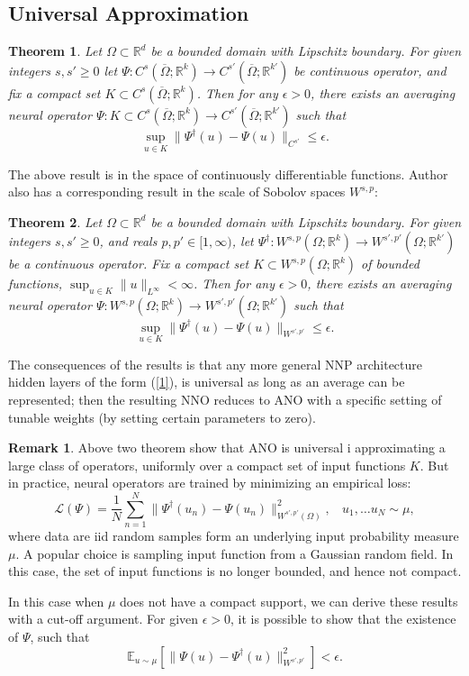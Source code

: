 \documentclass[reqno]{amsart}
\theoremstyle{plain}
\newtheorem{thm}{Theorem}
\theoremstyle{definition}
\newtheorem{rem}{Remark}
\newcommand{\bb}[1]{\mathbb{#1}}
\newcommand{\cal}[1]{\mathcal{#1}}
\begin{document}
\subsection{\bf Universal Approximation}
\begin{thm}\label{thm2.1}
    Let $\Omega \subset \bb R^d$ be a bounded domain with Lipschitz boundary. For given integers $s,s' \geq 0$ let $\Psi : C^s(\overline{\Omega};\bb R^k) \to C^{s'}(\overline{\Omega};\bb R^{k'})$ be continuous operator, and fix a compact set $K \subset C^s(\overline{\Omega};\bb R^k)$. Then for any $\epsilon > 0$, there exists an averaging neural operator $\Psi : K \subset C^s(\overline{\Omega};\bb R^k) \to C^{s'}(\overline{\Omega};\bb R^{k'})$ such that 
    $$ \sup\limits_{u \in K}\|\Psi^\dag (u) - \Psi(u)\|_{C^{s'}} \leq \epsilon.$$ 
\end{thm}
The above result is in the space of continuously differentiable functions. Author also has a corresponding result in the scale of Sobolov spaces $W^{s,p}$:
\begin{thm} \label{thm2.2}
    Let $\Omega \subset \bb R^d$ be a bounded domain with Lipschitz boundary. For given integers $s,s'\geq 0$, and reals $p,p' \in [1,\infty)$, let $\Psi^\dag: W^{s,p}(\Omega;\bb R^k) \to W^{s',p'}(\Omega;\bb R^{k'})$ be a continuous operator. Fix a compact set $K \subset W^{s,p}(\Omega;\bb R^k)$ of bounded functions, $\sup_{u \in K}\|u\|_{L^\infty} < \infty$. Then for any $\epsilon > 0$, there exists an averaging neural operator $\Psi:W^{s,p}(\Omega;\bb R^k) \to W^{s',p'}(\Omega;\bb R^{k'})$ such that 
    $$ \sup\limits_{u\in K}\|\Psi^\dag(u) - \Psi(u)\|_{W^{s',p'}} \leq \epsilon.$$
\end{thm}
The consequences of the results is that any more general NNP architecture hidden layers of the form (\ref{1}), is universal as long as an average can be represented; then the resulting NNO reduces to ANO with a specific setting of tunable weights (by setting certain parameters to zero).
\begin{rem}
    Above two theorem show that ANO is universal i approximating a large class of operators, uniformly over a compact set of input functions $K$. But in practice, neural operators are trained by minimizing an empirical loss:
    $$ \cal L(\Psi) = \frac{1}{N} \sum\limits_{n=1}^{N} \|\Psi^\dag(u_n) - \Psi(u_n)\|^2_{W^{s',p'}(\Omega)},~~~~u_1, \dots u_N \sim \mu,$$
    where data are iid random samples form an underlying input probability measure $\mu$. A popular choice is sampling input function from a Gaussian random field. In this case, the set of input functions is no longer bounded, and hence not compact.

    \noindent In this case when $\mu$ does not have a compact support, we can derive these results with a cut-off argument. For given $\epsilon > 0$, it is possible to show that the existence of $\Psi$, such that 
    $$ \bb E_{u\sim\mu}[\|\Psi(u) - \Psi^\dag(u)\|^2_{W^{s',p'}}] < \epsilon.$$
\end{rem}
\end{document}
